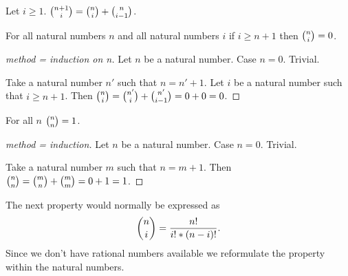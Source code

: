 \documentclass[english,11pt]{article}
\begin{document}
\begin{forthel}
\begin{axiom} Let $i \geq 1$.
${n+1 \choose i} = {n \choose i} + {n \choose i-1}$.
\end{axiom}

\begin{theorem} For all natural numbers $n$ and 
all natural numbers $i$
if $i \geq n + 1$ then ${n \choose i} = 0$.
\end{theorem}
\begin{proof}[method = induction on n]
Let $n$ be a natural number.
Case $n = 0$. Trivial.

Take a natural number $n'$ such that $n = n' + 1$.
Let $i$ be a natural number such that $i \geq n + 1$.
Then ${n \choose i} = {n' \choose i} + {n' \choose i-1} = 0 + 0 = 0$.
\end{proof}


\begin{theorem} For all $n$
${n \choose n} = 1$.
\end{theorem}
\begin{proof}[method = induction]
Let $n$ be a natural number.
Case $n = 0$. Trivial.

Take a natural number $m$ such that $n = m + 1$.
Then ${n \choose n} = {m \choose n} + {m \choose m} = 0 + 1 = 1$.

\end{proof}
\end{forthel}
%
The next property would normally be expressed as
%
$${n \choose i} = \frac{n !}{i ! * (n-i) !}.$$
%
Since we don't have rational numbers available we
reformulate the property within the natural numbers.
%
\end{document}
